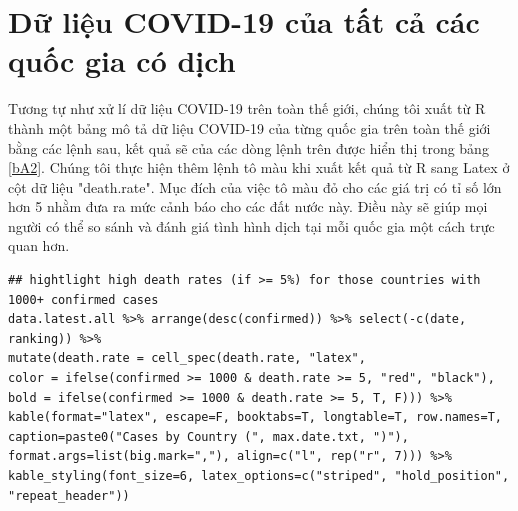 \documentclass[12pt, a4paper,oneside]{book}
\theoremstyle{definition}
\begin{document}
\section{Dữ liệu COVID-19 của tất cả các quốc gia có dịch}
Tương tự như xử lí dữ liệu COVID-19 trên toàn thế giới, chúng tôi xuất từ R thành một bảng mô tả dữ liệu COVID-19 của từng quốc gia trên toàn thế giới bằng các lệnh sau, kết quả sẽ của các dòng lệnh trên  được hiển thị trong bảng \ref{bA2}. Chúng tôi thực hiện thêm lệnh tô màu khi xuất kết quả từ R sang Latex ở cột dữ liệu "death.rate". Mục đích của việc tô màu đỏ cho các giá trị có tỉ số lớn hơn 5 nhằm đưa ra mức cảnh báo cho các đất nước này. Điều này sẽ giúp mọi người có thể so sánh và đánh giá tình hình dịch tại mỗi quốc gia một cách trực quan hơn.
\begin{lstlisting}
## hightlight high death rates (if >= 5%) for those countries with 1000+ confirmed cases
data.latest.all %>% arrange(desc(confirmed)) %>% select(-c(date, ranking)) %>%
mutate(death.rate = cell_spec(death.rate, "latex",
color = ifelse(confirmed >= 1000 & death.rate >= 5, "red", "black"),
bold = ifelse(confirmed >= 1000 & death.rate >= 5, T, F))) %>%
kable(format="latex", escape=F, booktabs=T, longtable=T, row.names=T,
caption=paste0("Cases by Country (", max.date.txt, ")"),
format.args=list(big.mark=","), align=c("l", rep("r", 7))) %>%
kable_styling(font_size=6, latex_options=c("striped", "hold_position", "repeat_header"))
\end{lstlisting}
\begingroup\fontsize{5.5}{11}\selectfont
\end{document}
